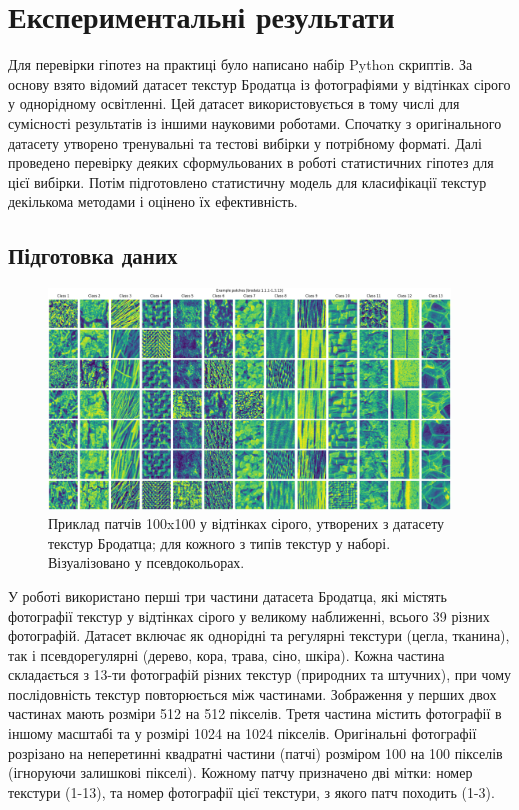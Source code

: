 \section{Експериментальні результати}\label{section2.1}

Для перевірки гіпотез на практиці було написано набір Python скриптів.
За основу взято відомий датасет текстур Бродатца \cite{brodatz} із фотографіями у відтінках сірого у однорідному освітленні.
Цей датасет використовується в тому числі для сумісності результатів із іншими науковими роботами.
Спочатку з оригінального датасету утворено тренувальні та тестові вибірки у потрібному форматі.
Далі проведено перевірку деяких сформульованих в роботі статистичних гіпотез для цієї вибірки.
Потім підготовлено статистичну модель для класифікації текстур декількома методами і оцінено їх ефективність.

\subsection{Підготовка даних}\label{section2.1a}

\begin{figure}[h]
    \centering
    \includegraphics[width=0.95\textwidth]{img/example_classes.png}
    \caption{
        Приклад патчів 100x100 у відтінках сірого, утворених з датасету текстур Бродатца; для кожного з типів текстур у наборі.
        Візуалізовано у псевдокольорах.
    }
    \label{fig:brodatz-showcase}
\end{figure}

У роботі використано перші три частини датасета Бродатца, які містять фотографії текстур у відтінках сірого у великому наближенні, всього 39 різних фотографій.
Датасет включає як однорідні та регулярні текстури (цегла, тканина), так і псевдорегулярні (дерево, кора, трава, сіно, шкіра). 
Кожна частина складається з 13-ти фотографій різних текстур (природних та штучних), при чому послідовність текстур повторюється між частинами. 
Зображення у перших двох частинах мають розміри 512 на 512 пікселів. 
Третя частина містить фотографії в іншому масштабі та у розмірі 1024 на 1024 пікселів.
Оригінальні фотографії розрізано на неперетинні квадратні частини (патчі) розміром 100 на 100 пікселів (ігноруючи залишкові пікселі).
Кожному патчу призначено дві мітки: номер текстури (1-13), та номер фотографії цієї текстури, з якого патч походить (1-3).

